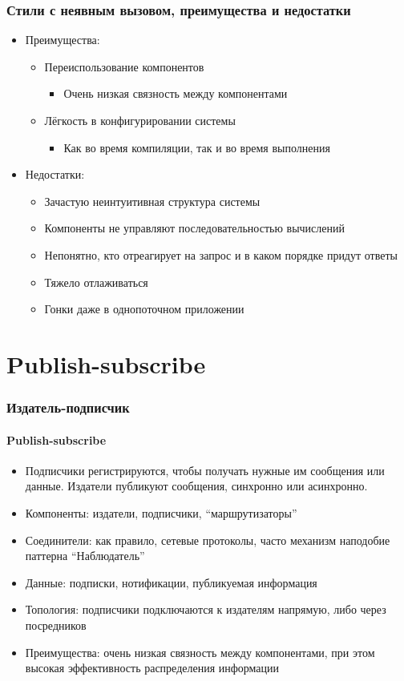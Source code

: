 \documentclass[xetex,mathserif,serif]{beamer}
\begin{document}
	\begin{frame}
		\frametitle{Стили с неявным вызовом, преимущества и недостатки}
		\begin{itemize}
			\item Преимущества:
			\begin{itemize}
				\item Переиспользование компонентов
				\begin{itemize}
					\item Очень низкая связность между компонентами
				\end{itemize}
				\item Лёгкость в конфигурировании системы
				\begin{itemize}
					\item Как во время компиляции, так и во время выполнения
				\end{itemize}
			\end{itemize}
			\item Недостатки:
			\begin{itemize}
				\item Зачастую неинтуитивная структура системы
				\item Компоненты не управляют последовательностью вычислений
				\item Непонятно, кто отреагирует на запрос и в каком порядке придут ответы
				\item Тяжело отлаживаться
				\item Гонки даже в однопоточном приложении
			\end{itemize}
		\end{itemize}
	\end{frame}

	\section{Publish-subscribe}

	\begin{frame}
		\frametitle{Издатель-подписчик}
		\framesubtitle{Publish-subscribe}
		\begin{itemize}
			\item Подписчики регистрируются, чтобы получать нужные им сообщения или данные. Издатели публикуют сообщения, синхронно или асинхронно.
			\item Компоненты: издатели, подписчики, ``маршрутизаторы''
			\item Соединители: как правило, сетевые протоколы, часто механизм наподобие паттерна ``Наблюдатель''
			\item Данные: подписки, нотификации, публикуемая информация
			\item Топология: подписчики подключаются к издателям напрямую, либо через посредников
			\item Преимущества: очень низкая связность между компонентами, при этом высокая эффективность распределения информации
		\end{itemize}
	\end{frame}
\end{document}
